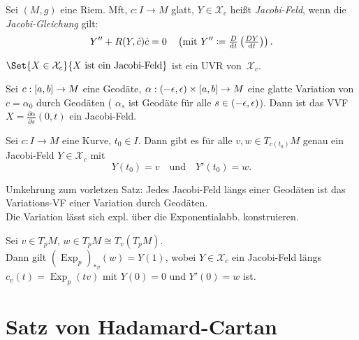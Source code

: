 \documentclass{cheat-sheet}
\DeclareMathOperator{\Exp}{Exp} %
\newcommand{\vinterval}{\ointerval{-\epsilon}{\epsilon}} %
\newcommand{\abinterval}{\cinterval{a}{b}} %
\newcommand{\VF}{\mathcal{X}} %
\begin{document}
\begin{defn}
  Sei $(M, g)$ eine Riem. Mft, $c : I \to M$ glatt, $Y \in \VF_c$ heißt \emph{Jacobi-Feld}, wenn die \emph{Jacobi-Gleichung} gilt:
  \[
    Y'' + R(Y, \dot{c}) \dot{c} = 0 \quad
    \left( \text{mit } Y'' \coloneqq \tfrac{D}{\mathrm{d} t} \left( \tfrac{D Y}{\mathrm{d} t} \right) \right).
  \]
\end{defn}

\begin{bem}
  $\Set{ X \in \VF_c }{ X \text{ ist ein Jacobi-Feld} }$ ist ein UVR von~$\VF_c$.
\end{bem}

\begin{satz}
  Sei $c : \abinterval \to M$ eine Geodäte, $\alpha : \vinterval \times \abinterval \to M$ eine glatte Variation von $c = \alpha_0$ durch Geodäten (\dh{} $\alpha_s$ ist Geodäte für alle $s \in \vinterval$). Dann ist das VVF $X = \tfrac{\partial \alpha}{\partial s}(0,t)$ ein Jacobi-Feld.
\end{satz}

\begin{satz}
  Sei $c : I \to M$ eine Kurve, $t_0 \in I$. Dann gibt es für alle $v, w \in T_{c(t_0)} M$ genau ein Jacobi-Feld $Y \in \VF_c$ mit
  \[
    Y(t_0) = v
    \quad \text{und} \quad
    Y'(t_0) = w.
  \]
\end{satz}

\begin{kor}
  Umkehrung zum vorletzen Satz: Jedes Jacobi-Feld längs einer Geodäten ist das Variations-VF einer Variation durch Geodäten. \\
  Die Variation lässt sich expl. über die Exponentialabb. konstruieren.
\end{kor}

\begin{satz}
  Sei $v \in T_p M$, $w \in T_p M \cong T_v \left( T_p M \right)$. \\
  Dann gilt $(\Exp_p)_{*v}(w) = Y(1)$, wobei $Y \in \VF_c$ ein Jacobi-Feld längs $c_v(t) = \Exp_p(tv)$ mit $Y(0) = 0$ und $Y'(0) = w$ ist.
\end{satz}


\section{Satz von Hadamard-Cartan}
\end{document}
